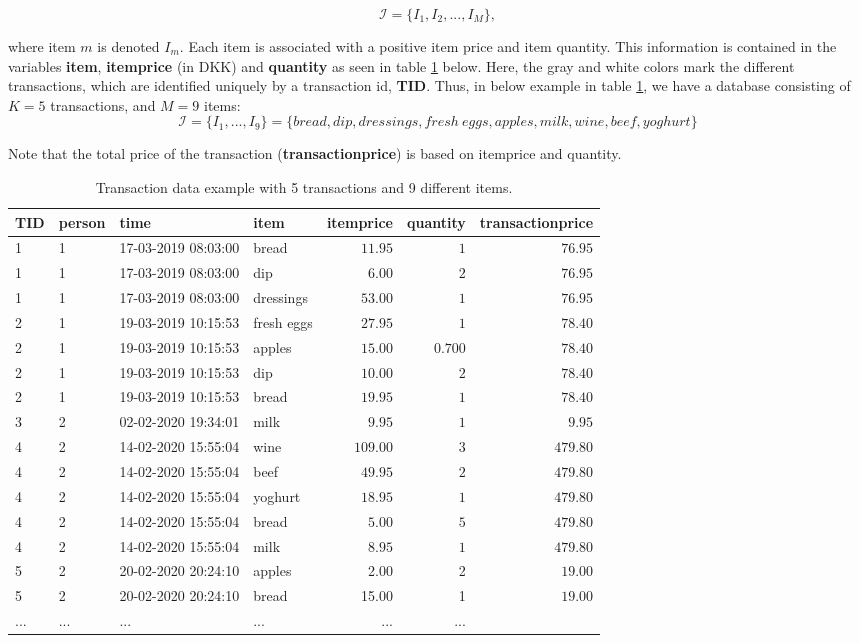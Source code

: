\documentclass[
  11pt,
]{article}
\begin{document}
\begin{equation}
\label{item_set}
\mathcal{I} = \{I_1, I_2,...,I_M\},
\end{equation}

where item \(m\) is denoted \(I_m\). Each item is associated with a
positive item price and item quantity. This information is contained in
the variables \textbf{item}, \textbf{itemprice} (in DKK) and
\textbf{quantity} as seen in table \ref{trans_table} below. Here, the
gray and white colors mark the different transactions, which are
identified uniquely by a transaction id, \textbf{TID}. Thus, in below
example in table \ref{trans_table}, we have a database consisting of
\(K=5\) transactions, and \(M=9\) items: \[
\mathcal{I} = \{I_1,...,I_9\} = \{bread, dip, dressings, fresh \  eggs, apples, milk, wine, beef, yoghurt\}
\]

Note that the total price of the transaction (\textbf{transactionprice})
is based on itemprice and quantity.

\begin{center}
\begin{table}[h]
\begin{tabular}{|l|l|l|l|r|r|r|} 
\hline
 TID & person & time & item & itemprice & quantity & transactionprice \\
\hline
\hline
\rowcolor{gray1} 1 & 1 & 17-03-2019 08:03:00 & bread & $11.95$ & $1$ & $76.95$\\
\rowcolor{gray1} 1 & 1 & 17-03-2019 08:03:00 & dip & $6.00$ & $2$ & $76.95$\\
\rowcolor{gray1} 1 & 1 & 17-03-2019 08:03:00 & dressings & $53.00$ & $1$ & $76.95$\\
2 & 1 & 19-03-2019 10:15:53 & fresh eggs & $27.95$ & $1$ & $78.40$\\
2 & 1 & 19-03-2019 10:15:53 & apples & $15.00$ & $0.700$ & $78.40$\\
2 & 1 & 19-03-2019 10:15:53 & dip & $10.00$ & $2$ & $78.40$\\
2 & 1 & 19-03-2019 10:15:53 & bread & $19.95$ & $1$ & $78.40$\\
\rowcolor{gray1} 3 & 2 & 02-02-2020 19:34:01 & milk & $9.95$ & $1$ & $9.95$\\
4 & 2 & 14-02-2020 15:55:04 & wine & $109.00$ & $3$ & $479.80$\\
4 & 2 & 14-02-2020 15:55:04 & beef & $49.95$ & $2$ & $479.80$\\
4 & 2 & 14-02-2020 15:55:04 & yoghurt & $18.95$ & $1$ & $479.80$\\
4 & 2 & 14-02-2020 15:55:04 & bread & $5.00$ & $5$ & $479.80$\\
4 & 2 & 14-02-2020 15:55:04 & milk & $8.95$ & $1$ & $479.80$\\
\rowcolor{gray1} 5 & 2 & 20-02-2020 20:24:10 & apples & 2.00 & 2 & $19.00$\\
\rowcolor{gray1} 5 & 2 & 20-02-2020 20:24:10 & bread & 15.00 & 1 & $19.00$\\
... & ... & ... & ... & ... & ... \\
\hline
\end{tabular}
\caption{Transaction data example with 5 transactions and 9 different items.}
\label{trans_table}
\end{table}
\end{center}
\end{document}
